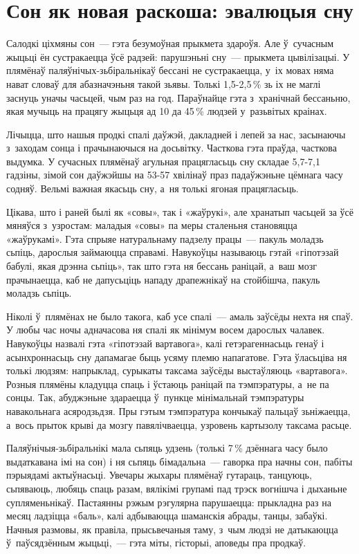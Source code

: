 \section{Сон як новая раскоша: эвалюцыя сну}

Салодкі ціхмяны сон~--- гэта безумоўная прыкмета здароўя. Але ў~сучасным жыцьці ён сустракаецца ўсё радзей: парушэньні сну~--- прыкмета цывілізацыі. У плямёнаў паляўнічых-зьбіральнікаў бессані не сустракаецца, у~іх мовах няма нават словаў для абазначэньня такой зьявы. Толькі 1,5-2,5\,\% зь іх не маглі заснуць уначы часьцей, чым раз на год. Параўнайце гэта з~хранічнай бессаньню, якая мучыць на працягу жыцьця ад 10 да 45\,\% людзей у~разьвітых краінах.

Лічыцца, што нашыя продкі спалі даўжэй, дакладней і лепей за нас, засынаючы з~заходам сонца і прачынаючыся на досьвітку. Часткова гэта праўда, часткова выдумка. У сучасных плямёнаў агульная працягласьць сну складае 5,7-7,1 гадзіны, зімой сон даўжэйшы на 53-57 хвілінаў праз падаўжэньне цёмнага часу содняў. Вельмі важная якасьць сну, а~ня толькі ягоная працягласьць.

Цікава, што і раней былі як «совы», так і «жаўрукі», але хранатып часьцей за ўсё мяняўся з~узростам: маладыя «совы» па меры сталеньня становяцца «жаўрукамі». Гэта спрыяе натуральнаму падзелу працы~--- пакуль моладзь сьпіць, дарослыя займаюцца справамі. Навукоўцы называюць гэтай «гіпотэзай бабулі, якая дрэнна сьпіць», так што гэта ня бессань раніцай, а~ваш мозг прачынаецца, каб не дапусьціць нападу драпежнікаў на стойбішча, пакуль моладзь сьпіць.

Ніколі ў~плямёнах не было такога, каб усе спалі~--- амаль заўсёды нехта ня спаў. У любы час ночы адначасова ня спалі як мінімум восем дарослых чалавек. Навукоўцы назвалі гэта «гіпотэзай вартавога», калі гетэрагеннасьць генаў і асынхроннасьць сну дапамагае быць усяму племю напагатове. Гэта ўласьціва ня толькі людзям: напрыклад, сурыкаты таксама заўсёды выстаўляюць «вартавога». Розныя плямёны кладуцца спаць і ўстаюць раніцай па тэмпэратуры, а~не па сонцы. Так, абуджэньне здараецца ў~пункце мінімальнай тэмпэратуры навакольнага асяродзьдзя. Пры гэтым тэмпэратура кончыкаў пальцаў зьніжаецца, а~вось прыток крыві да мозгу павялічваецца, узровень картызолу таксама расьце.

Паляўнічыя-зьбіральнікі мала сьпяць удзень (толькі 7\,\% дзённага часу было выдаткавана імі на сон) і ня сьпяць бімадальна~--- гаворка пра начны сон, пабіты пэрыядамі актыўнасьці. Увечары жыхары плямёнаў гутараць, танцуюць, сьпяваюць, любяць спаць разам, вялікімі групамі пад трэск вогнішча і дыханьне супляменьнікаў. Пастаянны рэжым рэгулярна парушаецца: прыкладна раз на месяц ладзіцца «баль», калі адбываюцца шаманскія абрады, танцы, забаўкі. Начныя размовы, як правіла, прысьвечаныя таму, з~чым людзі не датыкаюцца ў~паўсядзённым жыцьці,~--- гэта міты, гісторыі, аповеды пра продкаў.

